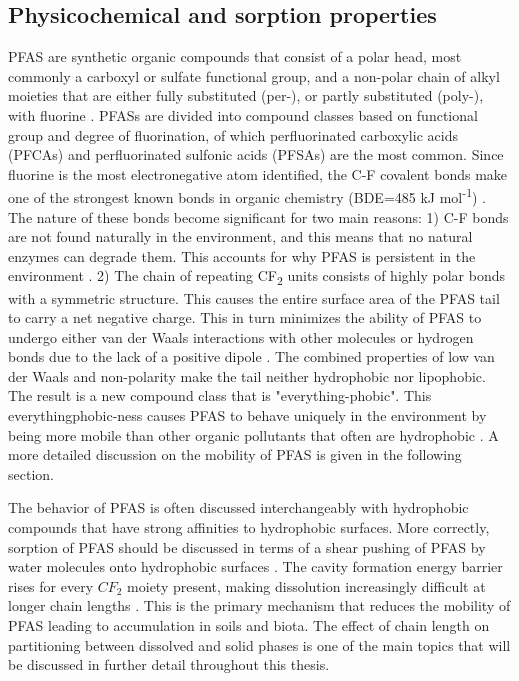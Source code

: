 \subsection{Physicochemical and sorption properties}\label{sec:physchem} 
PFAS are synthetic organic compounds that consist of a polar head, most commonly a carboxyl or sulfate functional group, and a non-polar chain of alkyl moieties that are either fully substituted (per-), or partly substituted (poly-), with fluorine \citep{wang2011physchem}. PFASs are divided into compound classes based on functional group and degree of fluorination, of which perfluorinated carboxylic acids (PFCAs) and perfluorinated sulfonic acids (PFSAs) are the most common. Since fluorine is the most electronegative atom identified, the C-F covalent bonds make one of the strongest known bonds in organic chemistry (BDE=485 kJ mol\textsuperscript{-1}) \citep{Lau2007}. The nature of these bonds become significant for two main reasons: 1) C-F bonds are not found naturally in the environment, and this means that no natural enzymes can degrade them. This accounts for why PFAS is persistent in the environment \citep{hale2020persistent,krafft2015per}. 2) The chain of repeating CF\textsubscript{2} units consists of highly polar bonds with a symmetric structure. This causes the entire surface area of the PFAS tail to carry a net negative charge. This in turn minimizes the ability of PFAS to undergo either van der Waals interactions with other molecules or hydrogen bonds due to the lack of a positive dipole \citep{Arp2006}. The combined properties of low van der Waals and non-polarity make the tail neither hydrophobic nor lipophobic. The result is a new compound class that is "everything-phobic". This everythingphobic-ness causes \acrshort{PFAS} to behave uniquely in the environment by being more mobile than other organic pollutants that often are hydrophobic \citep{hale2020persistent}. A more detailed discussion on the mobility of PFAS is given in the following section.  

The behavior of PFAS is often discussed interchangeably with hydrophobic compounds that have strong affinities to hydrophobic surfaces. More correctly, sorption of PFAS should be discussed in terms of a shear pushing of PFAS by water molecules onto hydrophobic surfaces \citep{Arp2006}. The cavity formation energy barrier rises for every $CF_2$ moiety present, making dissolution increasingly difficult at longer chain lengths \citep{bhhatarai2011,Arp2006}. This is the primary mechanism that reduces the mobility of PFAS leading to accumulation in soils and biota. The effect of chain length on partitioning between dissolved and solid phases is one of the main topics that will be discussed in further detail throughout this thesis.

